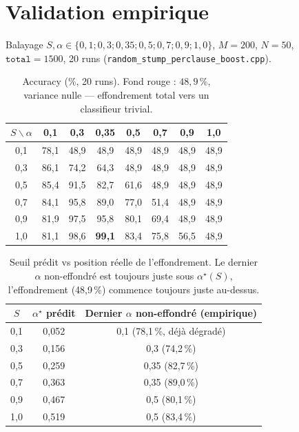 \documentclass[12pt,a4paper]{article}
\theoremstyle{remark}
\begin{document}
\section{Validation empirique}

Balayage $S,\alpha\in\{0{,}1;0{,}3;0{,}35;0{,}5;0{,}7;0{,}9;1{,}0\}$, $M=200$,
$N=50$, $\mathtt{total}=1500$, 20 runs (\texttt{random\_stump\_perclause\_boost.cpp}).

\begin{table}[h]
\centering
\renewcommand{\arraystretch}{1.2}
\begin{tabular}{cccccccc}
\toprule
$S \backslash \alpha$ & 0,1 & 0,3 & 0,35 & 0,5 & 0,7 & 0,9 & 1,0 \\
\midrule
0,1 & 78,1 & \cellcolor{red!15}48,9 & \cellcolor{red!15}48,9 & \cellcolor{red!15}48,9 & \cellcolor{red!15}48,9 & \cellcolor{red!15}48,9 & \cellcolor{red!15}48,9 \\
0,3 & 86,1 & 74,2 & 64,3 & \cellcolor{red!15}48,9 & \cellcolor{red!15}48,9 & \cellcolor{red!15}48,9 & \cellcolor{red!15}48,9 \\
0,5 & 85,4 & 91,5 & 82,7 & 61,6 & \cellcolor{red!15}48,9 & \cellcolor{red!15}48,9 & \cellcolor{red!15}48,9 \\
0,7 & 84,1 & 95,8 & 89,0 & 77,0 & 51,4 & \cellcolor{red!15}48,9 & \cellcolor{red!15}48,9 \\
0,9 & 81,9 & 97,5 & 95,8 & 80,1 & 69,4 & \cellcolor{red!15}48,9 & \cellcolor{red!15}48,9 \\
1,0 & 81,1 & 98,6 & \textbf{99,1} & 83,4 & 75,8 & 56,5 & \cellcolor{red!15}48,9 \\
\bottomrule
\end{tabular}
\caption{Accuracy (\%, 20 runs). Fond rouge : $48{,}9\,\%$, variance nulle ---
effondrement total vers un classifieur trivial.}
\end{table}

\begin{table}[h]
\centering
\begin{tabular}{ccc}
\toprule
$S$ & $\alpha^\star$ prédit & Dernier $\alpha$ non-effondré (empirique) \\
\midrule
0,1 & 0,052 & 0,1 (78,1\,\%, déjà dégradé) \\
0,3 & 0,156 & 0,3 (74,2\,\%) \\
0,5 & 0,259 & 0,35 (82,7\,\%) \\
0,7 & 0,363 & 0,35 (89,0\,\%) \\
0,9 & 0,467 & 0,5 (80,1\,\%) \\
1,0 & 0,519 & 0,5 (83,4\,\%) \\
\bottomrule
\end{tabular}
\caption{Seuil prédit vs position réelle de l'effondrement. Le dernier $\alpha$
non-effondré est toujours juste sous $\alpha^\star(S)$, l'effondrement (48,9\,\%)
commence toujours juste au-dessus.}
\end{table}
\end{document}
